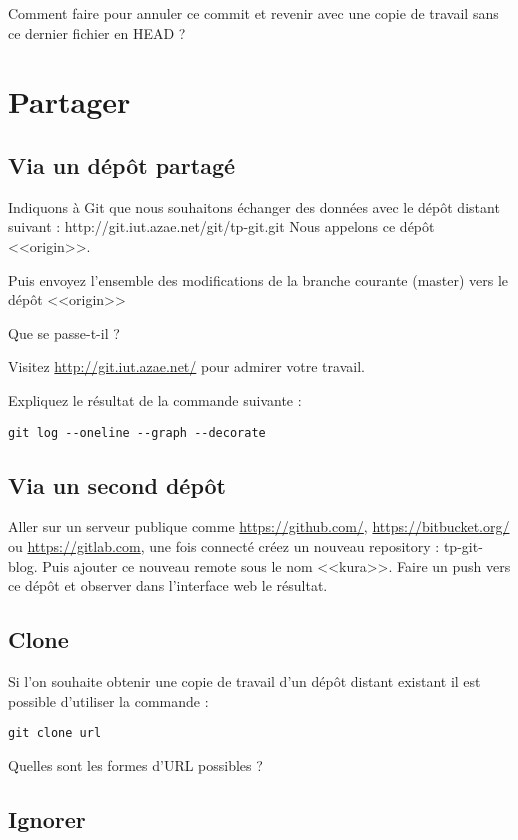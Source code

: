 \documentclass[a4paper]{article}
\begin{document}
Comment faire pour annuler ce commit et revenir avec une copie de travail sans ce dernier fichier en HEAD ?

\section{Partager}

\subsection{Via un dépôt partagé}

Indiquons à Git que nous souhaitons échanger des données avec le dépôt distant suivant : http://git.iut.azae.net/git/tp-git.git
Nous appelons ce dépôt <<origin>>.

Puis envoyez l'ensemble des modifications de la branche courante (master) vers le dépôt <<origin>>

Que se passe-t-il ?

Visitez \url{http://git.iut.azae.net/} pour admirer votre travail.

Expliquez le résultat de la commande suivante : 
\begin{verbatim}
git log --oneline --graph --decorate
\end{verbatim}

\subsection{Via un second dépôt}

Aller sur un serveur publique comme \url{https://github.com/}, \url{https://bitbucket.org/} ou \url{https://gitlab.com}, une fois connecté créez un nouveau repository : tp-git-blog. Puis ajouter ce nouveau remote sous le nom <<kura>>. Faire un push vers ce dépôt et observer dans l'interface web le résultat.

\subsection{Clone}
Si l'on souhaite obtenir une copie de travail d'un dépôt distant existant il est possible d'utiliser la commande :
\begin{verbatim}
git clone url
\end{verbatim}

Quelles sont les formes d'URL possibles ?

\subsection{Ignorer}
\end{document}

